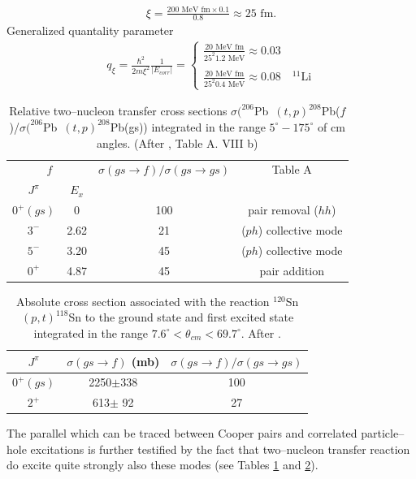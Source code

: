 \begin{subappendices}
 \begin{align}
 \xi=\frac{200\text{ MeV fm}\times 0.1}{0.8}\approx 25\text{ fm}.
 \end{align} 
 Generalized quantality parameter 
 \begin{align}
 q_{\xi}=\frac{\hbar^2}{2m\xi^2}\frac{1}{|E_{corr}|}=\left\{\begin{array}{l}
 \frac{20\text{ MeV fm}}{25^2 1.2\text{ MeV}}\approx 0.03	\\ 
 \\ 
 \frac{20\text{ MeV fm}}{25^2 0.4\text{ MeV}}\approx 0.08\quad ^{11}\text{Li}	
 \end{array}\right. 
 \end{align}
    \begin{table}
    	\begin{tabular}{|c|c|c|c|}
    		\hline
    		\multicolumn{2}{|c|}{$f$} & $\sigma(gs\rightarrow f)/\sigma(gs\rightarrow gs)$ & Table A   \\
    		\cline{1-2}
    		$J^{\pi}$& $E_x$ & & \\
    		\hline
    		$0^+(gs)$ & 0& 100& pair removal ($hh$)\\
    		\hline
    		$3^-$ & 2.62& 21& ($ph$) collective mode\\
    		\hline
    		$5^-$ & 3.20& 45& ($ph$) collective mode\\
    		\hline
    		$0^+$ & 4.87& 45& pair addition\\
    		\hline
    	\end{tabular}\caption{Relative two--nucleon transfer cross sections \mbox{$\sigma (^{206}$Pb $(t,p)^{208}$Pb($f$)/$\sigma (^{206}$Pb $(t,p)^{208}$Pb(gs))} integrated in the range $5^\circ-175^\circ$ of cm angles. (After \cite{Broglia:73}, Table A. VIII b)}\label{Tab3.B.1}
    \end{table}
    \begin{table}
    	\begin{tabular}{|c|c|c|}
    		\hline
    		$J^{\pi}$& $\sigma(gs\rightarrow f)$ (mb) & $\sigma(gs\rightarrow f)/\sigma(gs\rightarrow gs)$  \\
    		\hline
    		$0^+(gs)$ & 2250$\pm$338& 100\\
    		$2^+$ & 613$\pm$ 92& 27\\
    		\hline
    	\end{tabular}\caption{Absolute cross section associated with the reaction $^{120}$Sn $(p,t)^{118}$Sn to the ground state and first excited state integrated in the range $7.6^\circ < \theta_{cm}<69.7^\circ$. After \cite{Guazzoni:08}.}\label{Tab3.B.2}
    \end{table}
 The parallel which can be traced between Cooper pairs and correlated particle--hole excitations is further testified by the fact that two--nucleon transfer reaction do excite quite strongly also these modes (see Tables \ref{Tab3.B.1} and \ref{Tab3.B.2}). 


\end{subappendices}
